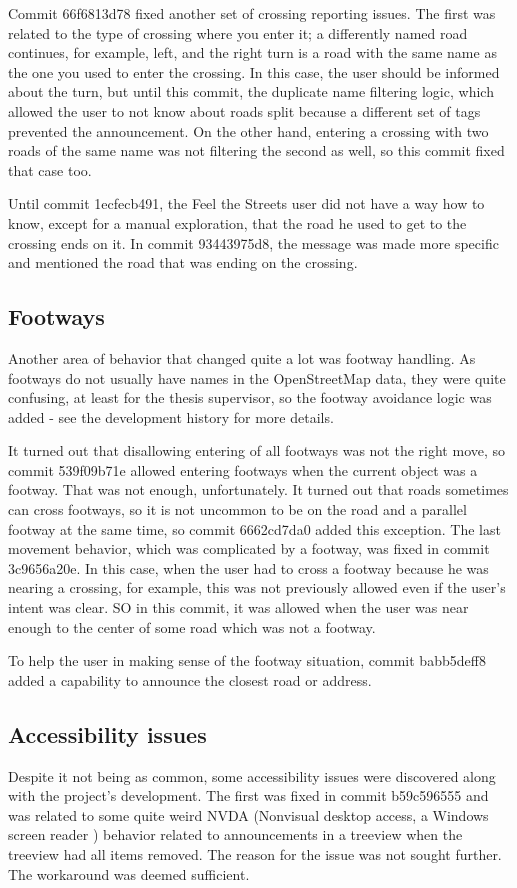 \documentclass[nolof,digital]{fithesis3}
\begin{document}
Commit 66f6813d78 fixed another set of crossing reporting issues. The first was related to the type of crossing where you enter it; a differently named road continues, for example, left, and the right turn is a road with the same name as the one you used to enter the crossing. In this case, the user should be informed about the turn, but until this commit, the duplicate name filtering logic, which allowed the user to not know about roads split because a different set of tags prevented the announcement. On the other hand, entering a crossing with two roads of the same name was not filtering the second as well, so this commit fixed that case too.

Until commit 1ecfecb491, the Feel the Streets user did not have a way how to know, except for a manual exploration, that the road he used to get to the crossing ends on it. In commit 93443975d8, the message was made more specific and mentioned the road that was ending on the crossing.
\subsection{Footways} \label{ref:footways}
Another area of behavior that changed quite a lot was footway handling. As footways do not usually have names in the OpenStreetMap data, they were quite confusing, at least for the thesis supervisor, so the footway avoidance logic was added - see the development history for more details.

It turned out that disallowing entering of all footways was not the right move, so commit 539f09b71e allowed entering footways when the current object was a footway. That was not enough, unfortunately. It turned out that roads sometimes can cross footways, so it is not uncommon to be on the road and a parallel footway at the same time, so commit 6662cd7da0 added this exception. The last movement behavior, which was complicated by a footway, was fixed in commit 3c9656a20e. In this case, when the user had to cross a footway because he was nearing a crossing, for example, this was not previously allowed even if the user's intent was clear. SO in this commit, it was allowed when the user was near enough to the center of some road which was not a footway.

To help the user in making sense of the footway situation, commit babb5deff8 added a capability to announce the closest road or address.
\subsection{Accessibility issues} \label{ref:accessibility}
Despite it not being as common, some accessibility issues were discovered along with the project's development. The first was fixed in commit b59c596555 and was related to some quite weird NVDA (Nonvisual desktop access, a Windows screen reader \parencite{nvda}) behavior related to announcements in a treeview when the treeview had all items removed. The reason for the issue was not sought further. The workaround was deemed sufficient.
\end{document}
